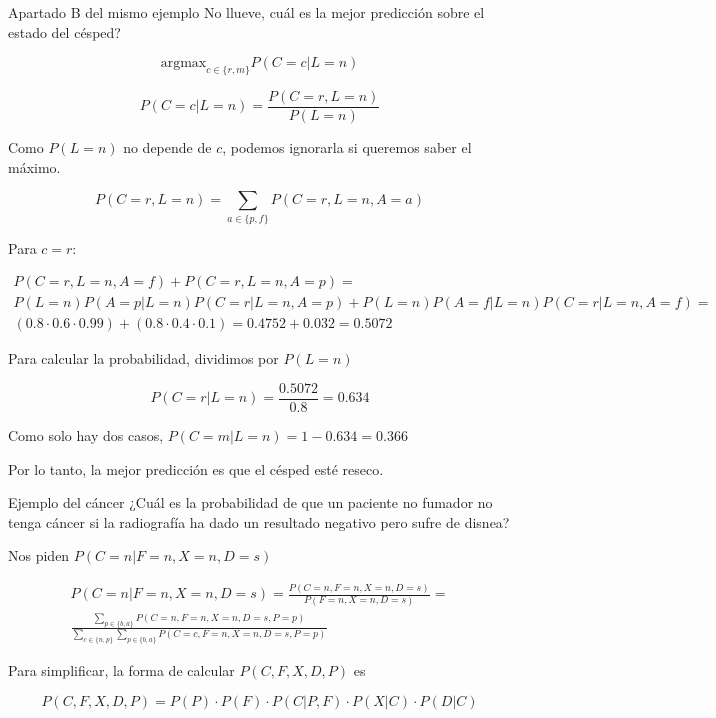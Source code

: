 \begin{exercisebox}{Apartado B del mismo ejemplo}
    No llueve, cuál es la mejor predicción sobre el estado del césped?
\end{exercisebox}

$$ \text{argmax}_{c \in \{r, m\}} P(C = c | L = n) $$

$$ P(C = c | L = n) = \frac{P(C = r, L = n)}{P(L = n)}$$

Como $P(L = n)$ no depende de $c$, podemos ignorarla si queremos saber el máximo.

$$P(C = r, L = n) = \sum_{a \in \{p, f\}} P(C = r, L = n, A = a)$$

Para $c = r$:

\begin{align*}
    P(C = r, L = n, A = f) + P(C = r, L = n, A = p) = \\[1em]
    P(L = n) P(A = p | L = n) P(C = r | L = n, A = p) + P(L = n) P(A = f | L = n) P(C = r | L = n, A = f) = \\[1em]
    (0.8 \cdot 0.6 \cdot 0.99) + (0.8 \cdot 0.4 \cdot 0.1) = 0.4752 + 0.032 = 0.5072
\end{align*}

Para calcular la probabilidad, dividimos por $P(L = n)$

$$ P(C = r | L = n) = \frac{0.5072}{0.8} = 0.634 $$

Como solo hay dos casos, $P(C = m | L = n) = 1 - 0.634 = 0.366$

Por lo tanto, la mejor predicción es que el césped esté reseco.

\begin{exercisebox}{Ejemplo del cáncer}
    ¿Cuál es la probabilidad de que un paciente no fumador no tenga cáncer si
    la radiografía ha dado un resultado negativo pero sufre de disnea?
\end{exercisebox}

Nos piden $ P(C = n | F = n, X = n, D = s) $

\begin{align*}
    P(C = n | F = n, X = n, D = s) = \frac{P(C = n, F = n, X = n, D = s)}{P(F = n, X = n, D = s)} = \\[1em]
    \frac{\sum_{p \in \{b, a\}} P(C = n, F = n, X = n, D = s, P = p)}{\sum_{c \in \{n, p\}} \sum_{p \in \{b, a\}} P(C = c, F = n, X = n, D = s, P = p)}
\end{align*}

Para simplificar, la forma de calcular $P(C, F, X, D, P)$ es

$$ P(C, F, X, D, P) = P(P) \cdot P(F) \cdot P(C | P, F) \cdot P(X | C) \cdot P(D | C) $$


